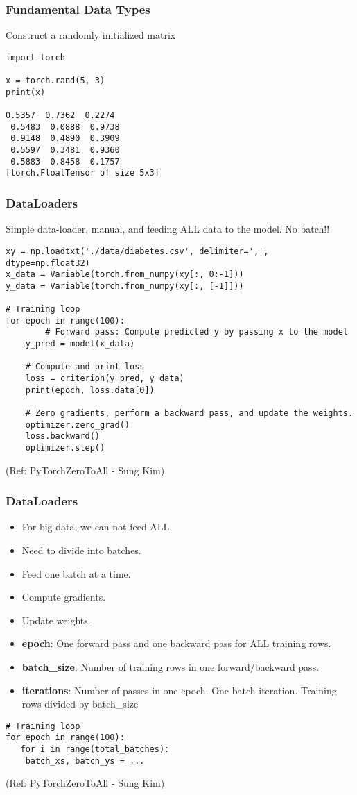 \begin{frame}[fragile] \frametitle{Fundamental Data Types}
Construct a randomly initialized matrix
\begin{lstlisting}
import torch

x = torch.rand(5, 3)
print(x)

0.5357  0.7362  0.2274
 0.5483  0.0888  0.9738
 0.9148  0.4890  0.3909
 0.5597  0.3481  0.9360
 0.5883  0.8458  0.1757
[torch.FloatTensor of size 5x3]
\end{lstlisting}
\end{frame}


\begin{frame}[fragile] \frametitle{DataLoaders}
Simple data-loader, manual, and feeding ALL data to the model. No batch!!
\begin{lstlisting}
xy = np.loadtxt('./data/diabetes.csv', delimiter=',', dtype=np.float32)
x_data = Variable(torch.from_numpy(xy[:, 0:-1]))
y_data = Variable(torch.from_numpy(xy[:, [-1]]))

# Training loop
for epoch in range(100):
        # Forward pass: Compute predicted y by passing x to the model
    y_pred = model(x_data)

    # Compute and print loss
    loss = criterion(y_pred, y_data)
    print(epoch, loss.data[0])

    # Zero gradients, perform a backward pass, and update the weights.
    optimizer.zero_grad()
    loss.backward()
    optimizer.step()
\end{lstlisting}

\tiny{(Ref: PyTorchZeroToAll  - Sung Kim)}
\end{frame}

\begin{frame}[fragile] \frametitle{DataLoaders}
\begin{itemize}
\item For big-data, we can not feed ALL. 
\item Need to divide into batches. 
\item Feed one batch at a time. 
\item Compute gradients.
\item Update weights.
\item \textbf{epoch}: One forward pass and one backward pass for ALL training rows.
\item \textbf{batch\_size}: Number of training rows in one forward/backward pass.
\item \textbf{iterations}: Number of passes in one epoch. One batch iteration. Training rows divided by batch\_size
\end{itemize}
\begin{lstlisting}
# Training loop
for epoch in range(100):
   for i in range(total_batches):
   	batch_xs, batch_ys = ...
\end{lstlisting}

\tiny{(Ref: PyTorchZeroToAll  - Sung Kim)}
\end{frame}

